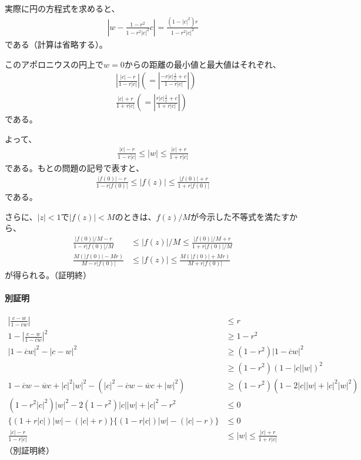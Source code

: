 実際に円の方程式を求めると、
\begin{align*}
    \left|w-\frac{1-r^2}{1-r^2|c|^2}c\right|
    =\frac{(1-|c|^2)r}{1-r^2|c|^2}
\end{align*}
である（計算は省略する）。

このアポロニウスの円上で$w=0$からの距離の最小値と最大値はそれぞれ、
\begin{align*}
    &\left|\frac{|c|-r}{1-r|c|}\right|
    \left(=\left|\frac{-r|c|\frac{1}{\overline{c}}+c}{1-r|c|}\right|\right)\\
    &\frac{|c|+r}{1+r|c|}
    \left(=\left|\frac{r|c|\frac{1}{\overline{c}}+c}{1+r|c|}\right|\right)
\end{align*}
である。

よって、
\begin{align*}
    \frac{|c|-r}{1-r|c|}
    \le|w|
    \le\frac{|c|+r}{1+r|c|}
\end{align*}
である。もとの問題の記号で表すと、
\begin{align*}
    \frac{|f(0)|-r}{1-r|f(0)|}
    \le|f(z)|
    \le\frac{|f(0)|+r}{1+r|f(0)|}
\end{align*}
である。

さらに、$|z|<1$で$|f(z)|<M$のときは、$f(z)/M$が今示した不等式を満たすから、
\begin{align*}
    \frac{|f(0)|/M-r}{1-r|f(0)|/M}
    &\le|f(z)|/M
    \le\frac{|f(0)|/M+r}{1+r|f(0)|/M}\\
    \frac{M(|f(0)|-Mr)}{M-r|f(0)|}
    &\le|f(z)|
    \le\frac{M(|f(0)|+Mr)}{M+r|f(0)|}
\end{align*}
が得られる。（証明終）

\paragraph{別証明}
\begin{align*}
    \left|\frac{c-w}{1-\overline{c}w}\right|&\le r\\
    1-\left|\frac{c-w}{1-\overline{c}w}\right|^2&\ge 1-r^2\\
    |1-\overline{c}w|^2-|c-w|^2&\ge(1-r^2)|1-\overline{c}w|^2\\
    &\ge(1-r^2)(1-|c||w|)^2\\
    1-\overline{c}w-\overline{w}c+|c|^2|w|^2
    -(|c|^2-\overline{c}w-\overline{w}c+|w|^2)
    &\ge(1-r^2)(1-2|c||w|+|c|^2|w|^2)\\
    (1-r^2|c|^2)|w|^2-2(1-r^2)|c||w|+|c|^2-r^2&\le0\\
    \{(1+r|c|)|w|-(|c|+r)\}\{(1-r|c|)|w|-(|c|-r)\}&\le0\\
    \frac{|c|-r}{1-r|c|}&\le|w|\le\frac{|c|+r}{1+r|c|}
\end{align*}
（別証明終）

